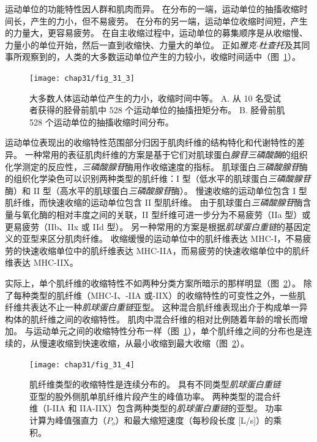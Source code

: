 运动单位的功能特性因人群和肌肉而异。
在分布的一端，运动单位的抽搐收缩时间长，产生的力小，但不易疲劳。
在分布的另一端，运动单位收缩时间短，产生的力量大，更容易疲劳。
在自主收缩过程中，运动单位的募集顺序是从收缩慢、力量小的单位开始，然后一直到收缩快、力量大的单位。 
正如\textit{雅克$\cdot$杜查托}及其同事所观察到的，人类的大多数运动单位产生的力较小，收缩时间适中（图~\ref{fig:31_3}）。


\begin{figure}[htbp]
	\centering
	\texttt{[image: chap31/fig\_31\_3]}
	\caption{大多数人体运动单位产生的力小，收缩时间中等\cite{cutsem1997mechanical}。
	A. 从 10 名受试者获得的胫骨前肌中 528 个运动单位的抽搐扭矩分布。
	B. 胫骨前肌 528 个运动单位的抽搐收缩时间分布。}
	\label{fig:31_3}
\end{figure}


运动单位表现出的收缩特性范围部分归因于肌肉纤维的结构特化和代谢特性的差异。
一种常用的表征肌肉纤维的方案是基于它们对肌球蛋白\textit{腺苷三磷酸酶}的组织化学测定的反应性，\textit{三磷酸腺苷}酶用作收缩速度的指标。
肌球蛋白\textit{三磷酸腺苷}酶的组织化学染色可以识别两种类型的肌纤维：I 型（低水平的肌球蛋白\textit{三磷酸腺苷}酶）和 II 型（高水平的肌球蛋白\textit{三磷酸腺苷}酶）。
慢速收缩的运动单位包含 I 型肌纤维，而快速收缩的运动单位包含 II 型肌纤维。
由于肌球蛋白\textit{三磷酸腺苷}酶含量与氧化酶的相对丰度之间的关联，II 型纤维可进一步分为不易疲劳（IIa 型）或更易疲劳（IIb、IIx 或 IId 型）。
另一种常用的方案是根据\textit{肌球蛋白重链}的基因定义的亚型来区分肌肉纤维。
收缩缓慢的运动单位中的肌纤维表达 MHC-I，不易疲劳的快速收缩单位中的肌纤维表达 MHC-IIA，而易疲劳的快速收缩单位中的肌纤维表达 MHC-IIX。


实际上，单个肌纤维的收缩特性不如两种分类方案所暗示的那样明显（图~\ref{fig:31_4}）。
除了每种类型的肌纤维（MHC-I、-IIA 或-IIX）的收缩特性的可变性之外，一些肌纤维共表达不止一种\textit{肌球蛋白重链}亚型。
这种混合肌纤维表现出介于构成单一异构体的肌纤维之间的收缩特性。
肌肉中混合纤维的相对比例随着年龄的增长而增加。
与运动单元之间的收缩特性分布一样（图~\ref{fig:31_3}），单个肌纤维之间的分布也是连续的，从慢速收缩到快速收缩，从最小收缩到最大收缩（图~\ref{fig:31_4}）。


\begin{figure}[htbp]
	\centering
	\texttt{[image: chap31/fig\_31\_4]}
	\caption{肌纤维类型的收缩特性是连续分布的。
	具有不同类型\textit{肌球蛋白重链}亚型的股外侧肌单肌纤维片段产生的峰值功率。
	两种类型的混合纤维（I-IIA 和 IIA-IIX）包含两种类型的\textit{肌球蛋白重链}的亚型。
	功率计算为峰值强直力（$P_o$）和最大缩短速度（每秒段长度 [L/s]）的乘积\cite{bottinelli1996force}。}
	\label{fig:31_4}
\end{figure}



